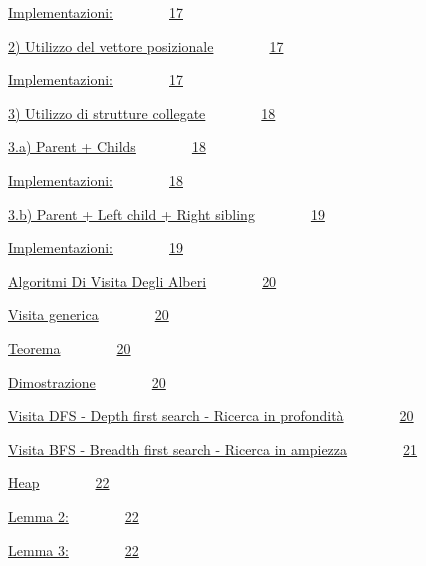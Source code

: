 \documentclass{article}
\begin{document}
{\protect\hyperlink{h.ncrwkhkrovb2}{Implementazioni:}}{~~~~~~~~}{\protect\hyperlink{h.ncrwkhkrovb2}{17}}

{\protect\hyperlink{h.5u7fhayyby4r}{2) Utilizzo del vettore
posizionale}}{~~~~~~~~}{\protect\hyperlink{h.5u7fhayyby4r}{17}}

{\protect\hyperlink{h.6c4aui6rl05k}{Implementazioni:}}{~~~~~~~~}{\protect\hyperlink{h.6c4aui6rl05k}{17}}

{\protect\hyperlink{h.bhzctdrna7ur}{3) Utilizzo di strutture
collegate}}{~~~~~~~~}{\protect\hyperlink{h.bhzctdrna7ur}{18}}

{\protect\hyperlink{h.qoohix7mgjib}{3.a) Parent +
Childs}}{~~~~~~~~}{\protect\hyperlink{h.qoohix7mgjib}{18}}

{\protect\hyperlink{h.7iunf1nu58vy}{Implementazioni:}}{~~~~~~~~}{\protect\hyperlink{h.7iunf1nu58vy}{18}}

{\protect\hyperlink{h.jlqu76iomg9e}{3.b) Parent + Left child + Right
sibling}}{~~~~~~~~}{\protect\hyperlink{h.jlqu76iomg9e}{19}}

{\protect\hyperlink{h.ekfyi4oujqjt}{Implementazioni:}}{~~~~~~~~}{\protect\hyperlink{h.ekfyi4oujqjt}{19}}

{\protect\hyperlink{h.ike679k4smgg}{Algoritmi Di Visita Degli
Alberi}}{~~~~~~~~}{\protect\hyperlink{h.ike679k4smgg}{20}}

{\protect\hyperlink{h.dvc71mavuqx7}{Visita
generica}}{~~~~~~~~}{\protect\hyperlink{h.dvc71mavuqx7}{20}}

{\protect\hyperlink{h.6xasx7f8zgn1}{Teorema}}{~~~~~~~~}{\protect\hyperlink{h.6xasx7f8zgn1}{20}}

{\protect\hyperlink{h.zdc8liauzt1c}{Dimostrazione}}{~~~~~~~~}{\protect\hyperlink{h.zdc8liauzt1c}{20}}

{\protect\hyperlink{h.5u7m241wpdag}{Visita DFS - Depth first search -
Ricerca in
profondità}}{~~~~~~~~}{\protect\hyperlink{h.5u7m241wpdag}{20}}

{\protect\hyperlink{h.j29c1mxwyzyn}{Visita BFS - Breadth first search -
Ricerca in ampiezza}}{~~~~~~~~}{\protect\hyperlink{h.j29c1mxwyzyn}{21}}

{\protect\hyperlink{h.8cvon0yw5yug}{Heap}}{~~~~~~~~}{\protect\hyperlink{h.8cvon0yw5yug}{22}}

{\protect\hyperlink{h.twk46x6owxrr}{Lemma
2:}}{~~~~~~~~}{\protect\hyperlink{h.twk46x6owxrr}{22}}

{\protect\hyperlink{h.wlc8yrs7inpk}{Lemma
3:}}{~~~~~~~~}{\protect\hyperlink{h.wlc8yrs7inpk}{22}}
\end{document}
